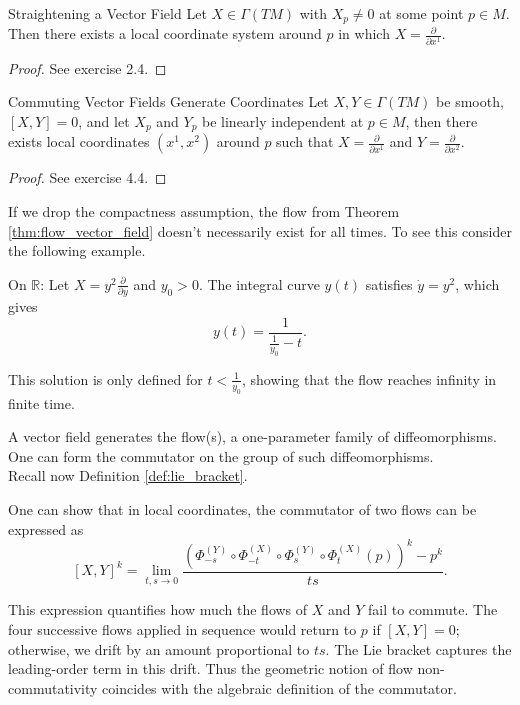 \begin{colorlem}{Straightening a Vector Field}{}
Let $X \in \Gamma(TM)$ with $X_p \neq 0$ at some point $p \in M$. Then there exists a local coordinate system around $p$ in which $X = \frac{\partial}{\partial x^1}$.
\end{colorlem}
\begin{proof}
See exercise 2.4.
\end{proof}


\begin{colorlem}{Commuting Vector Fields Generate Coordinates}{}
Let $X, Y \in \Gamma(TM)$ be smooth, $[X, Y] = 0$, and let $X_p$ and $Y_p$ be linearly independent at $p \in M$, then there exists local coordinates $(x^1, x^2)$ around $p$ such that $X = \frac{\partial}{\partial x^1}$ and $Y = \frac{\partial}{\partial x^2}$.
\end{colorlem}

\begin{proof}
See exercise 4.4.
\end{proof}



If we drop the compactness assumption, the flow from Theorem \ref{thm:flow_vector_field} doesn't necessarily exist for all times. To see this consider the following example.
\begin{colexample}{}{}

On $\mathbb{R}$: Let $X = y^2 \frac{\partial}{\partial y}$ and $y_0 > 0$. The integral curve $y(t)$ satisfies $\dot{y} = y^2$, which gives
\[
y(t) = \frac{1}{\frac{1}{y_0} - t}.
\]

This solution is only defined for $t < \frac{1}{y_0}$, showing that the flow reaches infinity in finite time.
\end{colexample}

A vector field generates the flow(s), a one-parameter family of diffeomorphisms. One can form the commutator on the group of such diffeomorphisms.\\

Recall now Definition \ref{def:lie_bracket}. 

\begin{colremark}
One can show that in local coordinates, the commutator of two flows can be expressed as
\[
[X,Y]^k = \lim_{t,s \to 0} \frac{\left(\Phi^{(Y)}_{-s} \circ \Phi^{(X)}_{-t} \circ \Phi^{(Y)}_{s} \circ \Phi^{(X)}_{t}(p)\right)^k - p^k}{ts}.
\]
\end{colremark}

This expression quantifies how much the flows of $X$ and $Y$ fail to commute. The four successive flows applied in sequence would return to $p$ if $[X,Y] = 0$; otherwise, we drift by an amount proportional to $ts$. The Lie bracket captures the leading-order term in this drift. Thus the geometric notion of flow non-commutativity coincides with the algebraic definition of the commutator.




